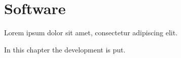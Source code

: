 \chapter{Software}\label{ch:system-development}
Lorem ipsum dolor sit amet, consectetur adipiscing elit.

In this chapter the development is put.
%
